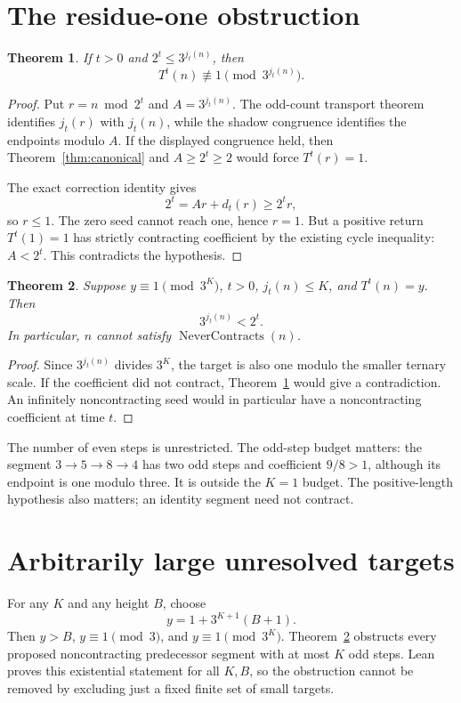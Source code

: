 \documentclass[10pt]{article}
\newtheorem{theorem}{Theorem}
\begin{document}
\section{The residue-one obstruction}
\begin{theorem}\label{thm:full}
If $t>0$ and $2^t\le3^{j_t(n)}$, then
\[
T^t(n)\not\equiv1\pmod{3^{j_t(n)}}.
\]
\end{theorem}
\begin{proof}
Put $r=n\bmod2^t$ and $A=3^{j_t(n)}$. The odd-count transport theorem
identifies $j_t(r)$ with $j_t(n)$, while the shadow congruence identifies
the endpoints modulo $A$. If the displayed congruence held, then
Theorem~\ref{thm:canonical} and $A\ge2^t\ge2$ would force $T^t(r)=1$.

The exact correction identity gives
\[
2^t=A r+d_t(r)\ge2^t r,
\]
so $r\le1$. The zero seed cannot reach one, hence $r=1$. But a positive
return $T^t(1)=1$ has strictly contracting coefficient by the existing
cycle inequality: $A<2^t$. This contradicts the hypothesis.
\end{proof}
\begin{theorem}\label{thm:budget}
Suppose $y\equiv1\pmod{3^K}$, $t>0$, $j_t(n)\le K$, and $T^t(n)=y$.
Then
\[
3^{j_t(n)}<2^t.
\]
In particular, $n$ cannot satisfy $\operatorname{NeverContracts}(n)$.
\end{theorem}
\begin{proof}
Since $3^{j_t(n)}$ divides $3^K$, the target is also one modulo the smaller
ternary scale. If the coefficient did not contract, Theorem~\ref{thm:full}
would give a contradiction. An infinitely noncontracting seed would in
particular have a noncontracting coefficient at time $t$.
\end{proof}

The number of even steps is unrestricted. The odd-step budget matters:
the segment $3\to5\to8\to4$ has two odd steps and coefficient $9/8>1$,
although its endpoint is one modulo three. It is outside the $K=1$ budget.
The positive-length hypothesis also matters; an identity segment need not
contract.

\section{Arbitrarily large unresolved targets}
For any $K$ and any height $B$, choose
\[
y=1+3^{K+1}(B+1).
\]
Then $y>B$, $y\equiv1\pmod3$, and $y\equiv1\pmod{3^K}$.
Theorem~\ref{thm:budget} obstructs every proposed noncontracting predecessor
segment with at most $K$ odd steps. Lean proves this existential statement
for all $K,B$, so the obstruction cannot be removed by excluding just a
fixed finite set of small targets.
\end{document}
